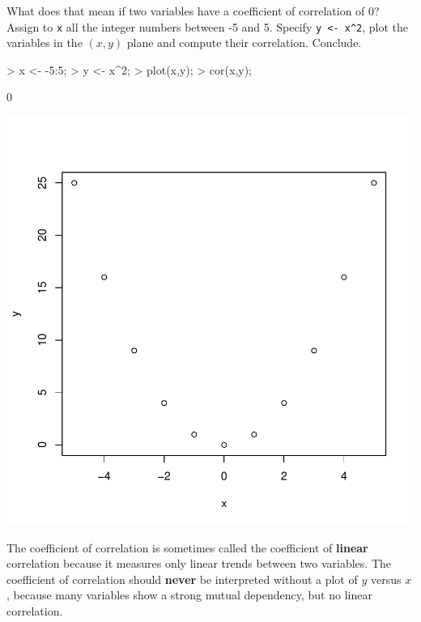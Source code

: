 \documentclass[a4paper]{article}
\theoremstyle{definition}
\begin{document}
\begin{Exercise}
What does that mean if two variables have a coefficient of correlation of
0? Assign to \texttt{x} all the integer numbers between -5 and 5. Specify
\texttt{y <- x\^{}2}, plot the variables in the $(x,y)$ plane and compute their
correlation. Conclude.
\end{Exercise}
\begin{Answer}
\begin{Schunk}
\begin{Sinput}
> x <- -5:5;
> y <- x^2;
> plot(x,y);
> cor(x,y);
\end{Sinput}
\begin{Soutput}
[1] 0
\end{Soutput}
\end{Schunk}
\includegraphics{correlation-005}
\par
The coefficient of correlation is sometimes called the coefficient of
\textbf{linear} correlation because it measures only linear trends between
two variables. The coefficient of correlation should \textbf{never} be
interpreted without a plot of $y$ versus $x$, because many variables show
a strong mutual dependency, but no linear correlation.
\end{Answer}


\cleardoublepage
\shipoutAnswer
\end{document}
